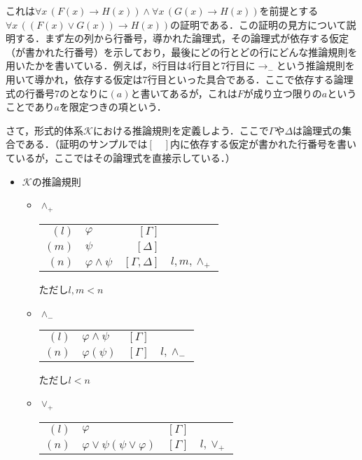 \documentclass[10pt,b5paper,papersize,dvipdfmx]{jsbook}
\newcommand\fal[1]{\forall#1\,}
\begin{document}
これは$\fal{x} (F(x) \to H(x)) \land \fal{x} (G(x) \to H(x))$を前提とする$\fal{x} ((F(x) \lor G(x)) \to H(x))$の証明である．この証明の見方について説明する．まず左の列から行番号，導かれた論理式，その論理式が依存する仮定（が書かれた行番号）を示しており，最後にどの行とどの行にどんな推論規則を用いたかを書いている．例えば，8行目は4行目と7行目に$\to_-$という推論規則を用いて導かれ，依存する仮定は7行目といった具合である．ここで依存する論理式の行番号7のとなりに$(a)$と書いてあるが，これは$F$が成り立つ限りの$a$ということであり$a$を限定つきの項という．\par
さて，形式的体系$\mathcal K$における推論規則を定義しよう．ここで$\Gamma$や$\Delta$は論理式の集合である．（証明のサンプルでは$[\quad]$内に依存する仮定が書かれた行番号を書いているが，ここではその論理式を直接示している．）
\begin{itemize}
  \item $\mathcal K$の推論規則
  \begin{itemize}
    \item $\land_+$
      \begin{table}[H]
        \centering
        \begin{tabular}{rlrl}
          $(l)$ & $\varphi$ & $[\Gamma]$ &  \\
          $(m)$ & $\psi$ & $[\Delta]$ &  \\
          $(n)$ & $\varphi \land \psi$ & $[\Gamma,\Delta]$ & $l,m,\land_+$
        \end{tabular}
      \end{table}
      ただし$l,m<n$
    \item $\land_-$
      \begin{table}[H]
        \centering
        \begin{tabular}{rlrl}
          $(l)$ & $\varphi \land \psi$ & $[\Gamma]$ &  \\
          $(n)$ & $\varphi (\psi)$ & $[\Gamma]$ & $l,\land_-$ \\
        \end{tabular}
      \end{table}
      ただし$l<n$
    \item $\lor_+$
      \begin{table}[H]
        \centering
        \begin{tabular}{rlrl}
          $(l)$&$\varphi$&$[\Gamma]$& \\
          $(n)$&$\varphi \lor \psi (\psi \lor \varphi)$&$[\Gamma]$&$l,\lor_+$
        \end{tabular}
      \end{table}

\end{itemize}
\end{itemize}
\end{document}
